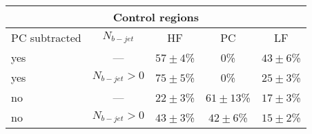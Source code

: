 \begin{tabular}{|lc|ccc|}
    \hline
    \multicolumn{5}{|c|}{\bf{Control regions}}   \\ \hline \hline
    PC subtracted &$N_{b-jet}$  &{HF} &{PC} &{LF} \\ \hline
    yes &--- &$57\pm 4$\%  &$0$\% &$43\pm 6$\% \\
    yes &$N_{b-jet}>0$  &$75\pm 5$\% &$0$\% &$25\pm 3$\% \\ \hline
    no &--- &$22\pm 3$\% &$61\pm 13$\% &$17\pm 3$\% \\
    no &$N_{b-jet}>0$  &$43\pm 3$\% &$42\pm 6$\% &$15\pm 2$\% \\ 
    \hline
	
\end{tabular}



